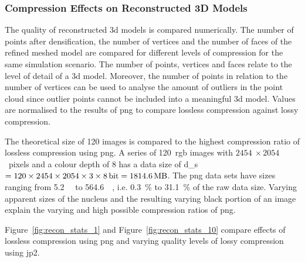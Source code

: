 
\subsubsection{Compression Effects on Reconstructed 3D Models}
The quality of  reconstructed \gls{3d} models is compared numerically. The number of points after densification, the number of vertices and the number of faces of the refined meshed model are compared for different levels of compression for the same simulation scenario. The number of points, vertices and faces relate to the level of detail of a \gls{3d} model. Moreover, the number of points in relation to the number of vertices can be used to analyse the amount of outliers in the point cloud since outlier points cannot be included into a meaningful \gls{3d} model. Values are normalised to the results of \gls{png} to compare lossless compression against lossy compression.

The theoretical size of \SI{120}{} images is compared to the highest compression ratio of lossless compression using \gls{png}. A series of \SI{120}{}~\gls{rgb} images with $\SI{2454}{} \times \SI{2054}{}$~pixels and a colour depth of \SI{8}{\bit} has a data size of \gls{d_s}$ = 120 \times 2454 \times 2054 \times 3 \times \SI{8}{\bit} = \SI{1814.6}{\mega\byte}$. The \gls{png} data sets have sizes ranging from \SI{5.2}{\mega\byte} to \SI{564.6}{\mega\byte}, i.e. \SI{0.3}{\percent} to \SI{31.1}{\percent} of the raw data size. Varying apparent sizes of the nucleus and the resulting varying black portion of an image explain the varying and high possible compression ratios of \gls{png}.

Figure~\ref{fig:recon_stats_1} and Figure~\ref{fig:recon_stats_10} compare effects of lossless compression using \gls{png} and varying quality levels of lossy compression using \gls{jp2}.

